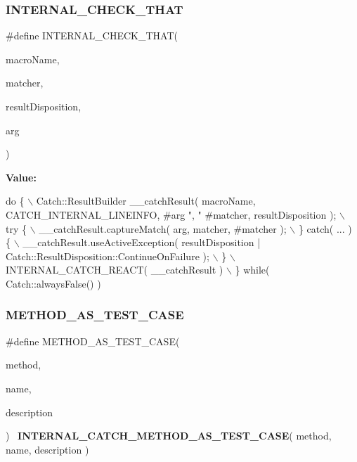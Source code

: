 \mbox{\label{catch_8hpp_a877690adc04f1fbfe944df6bebe6f8b5}} 
\subsubsection{I\+N\+T\+E\+R\+N\+A\+L\+\_\+\+C\+H\+E\+C\+K\+\_\+\+T\+H\+AT}
{\footnotesize\ttfamily \#define I\+N\+T\+E\+R\+N\+A\+L\+\_\+\+C\+H\+E\+C\+K\+\_\+\+T\+H\+AT(\begin{DoxyParamCaption}\item[{}]{macro\+Name,  }\item[{}]{matcher,  }\item[{}]{result\+Disposition,  }\item[{}]{arg }\end{DoxyParamCaption})}

{\bfseries Value\+:}
\begin{DoxyCode}
\textcolor{keywordflow}{do} \{ \(\backslash\)
        Catch::ResultBuilder \_\_catchResult( macroName, CATCH_INTERNAL_LINEINFO, #arg \textcolor{stringliteral}{", "} #matcher, 
      resultDisposition ); \(\backslash\)
        try \{ \(\backslash\)
            \_\_catchResult.captureMatch( arg, matcher, #matcher ); \(\backslash\)
        \} \textcolor{keywordflow}{catch}( ... ) \{ \(\backslash\)
            \_\_catchResult.useActiveException( resultDisposition | 
      Catch::ResultDisposition::ContinueOnFailure ); \(\backslash\)
        \} \(\backslash\)
        INTERNAL\_CATCH\_REACT( \_\_catchResult ) \(\backslash\)
    \} \textcolor{keywordflow}{while}( Catch::alwaysFalse() )
\end{DoxyCode}
\mbox{\label{catch_8hpp_a7cbb972e639dfcccaa0f479715b35be2}} 
\subsubsection{M\+E\+T\+H\+O\+D\+\_\+\+A\+S\+\_\+\+T\+E\+S\+T\+\_\+\+C\+A\+SE}
{\footnotesize\ttfamily \#define M\+E\+T\+H\+O\+D\+\_\+\+A\+S\+\_\+\+T\+E\+S\+T\+\_\+\+C\+A\+SE(\begin{DoxyParamCaption}\item[{}]{method,  }\item[{}]{name,  }\item[{}]{description }\end{DoxyParamCaption})~\textbf{ I\+N\+T\+E\+R\+N\+A\+L\+\_\+\+C\+A\+T\+C\+H\+\_\+\+M\+E\+T\+H\+O\+D\+\_\+\+A\+S\+\_\+\+T\+E\+S\+T\+\_\+\+C\+A\+SE}( method, name, description )}

